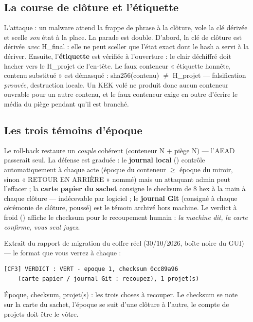 \subsection{La course de clôture et l'étiquette}\label{sec:course}

L'attaque : un malware attend la frappe de phrase à la clôture, vole la clé dérivée et
scelle \emph{son} état à la place. La parade est double. D'abord, la clé de clôture
est dérivée \emph{avec} H\_final : elle ne peut sceller que l'état exact dont le hash a
servi à la dériver. Ensuite, l'\textbf{étiquette} est vérifiée à l'ouverture : le clair
déchiffré doit hacher vers le H\_projet de l'en-tête. Le faux conteneur « étiquette
honnête, contenu substitué » est démasqué : sha256(contenu) $\neq$ H\_projet —
falsification \emph{prouvée}, destruction locale. Un KEK volé ne produit donc aucun
conteneur ouvrable pour un autre contenu, et le faux conteneur exige en outre d'écrire
le média du piège pendant qu'il est branché.

\subsection{Les trois témoins d'époque}\label{sec:temoins}

Le roll-back restaure un \emph{couple} cohérent (conteneur N + piège N) — l'AEAD
passerait seul. La défense est graduée : le \textbf{journal local}
() contrôle automatiquement à chaque acte (époque du
conteneur $\geq$ époque du miroir, sinon « RETOUR EN ARRIÈRE » nommé) mais un attaquant
admin peut l'effacer ; la \textbf{carte papier du sachet} consigne le checksum de 8 hex
à la main à chaque clôture — indécevable par logiciel ; le \textbf{journal Git}
(consigné à chaque cérémonie de clôture, poussé) est le témoin archivé hors machine.
Le verdict à froid () affiche le checksum pour le recoupement humain :
\emph{la machine dit, la carte confirme, vous seul jugez}.

\begin{terrain}
Extrait du rapport de migration du coffre réel (30/10/2026, boîte noire du GUI) — le
format que vous verrez à chaque  :
\begin{lstlisting}
[CF3] VERDICT : VERT - epoque 1, checksum 0cc89a96
    (carte papier / journal Git : recoupez), 1 projet(s)
\end{lstlisting}
Époque, checksum, projet(s) : les trois choses à recouper. Le checksum se note sur la
carte du sachet, l'époque se suit d'une clôture à l'autre, le compte de projets doit
être le vôtre.
\end{terrain}

